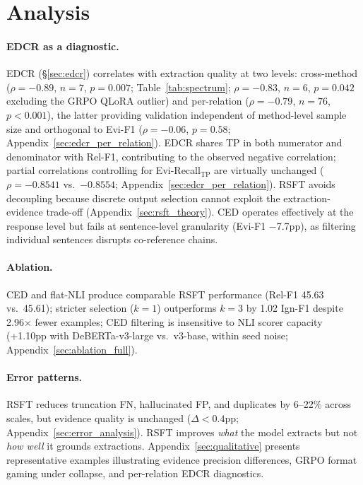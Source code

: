 \section{Analysis}
\label{sec:analysis}

\paragraph{EDCR as a diagnostic.}
EDCR (\S\ref{sec:edcr}) correlates with extraction quality at two levels: cross-method ($\rho = -0.89$, $n = 7$, $p = 0.007$; Table~\ref{tab:spectrum}; $\rho = -0.83$, $n = 6$, $p = 0.042$ excluding the GRPO QLoRA outlier) and per-relation ($\rho = -0.79$, $n = 76$, $p < 0.001$), the latter providing validation independent of method-level sample size and orthogonal to Evi-F1 ($\rho = -0.06$, $p = 0.58$; Appendix~\ref{sec:edcr_per_relation}). EDCR shares TP in both numerator and denominator with Rel-F1, contributing to the observed negative correlation; partial correlations controlling for Evi-Recall$_\text{TP}$ are virtually unchanged ($\rho = -0.8541$ vs.\ $-0.8554$; Appendix~\ref{sec:edcr_per_relation}). RSFT avoids decoupling because discrete output selection cannot exploit the extraction-evidence trade-off (Appendix~\ref{sec:rsft_theory}). CED operates effectively at the response level but fails at sentence-level granularity (Evi-F1 $-$7.7pp), as filtering individual sentences disrupts co-reference chains.

\paragraph{Ablation.}
CED and flat-NLI produce comparable RSFT performance (Rel-F1 45.63 vs.\ 45.61); stricter selection ($k{=}1$) outperforms $k{=}3$ by 1.02 Ign-F1 despite 2.96$\times$ fewer examples; CED filtering is insensitive to NLI scorer capacity (+1.10pp with DeBERTa-v3-large vs.\ v3-base, within seed noise; Appendix~\ref{sec:ablation_full}).

\paragraph{Error patterns.}
RSFT reduces truncation FN, hallucinated FP, and duplicates by 6--22\% across scales, but evidence quality is unchanged ($\Delta < 0.4$pp; Appendix~\ref{sec:error_analysis}). RSFT improves \emph{what} the model extracts but not \emph{how well} it grounds extractions. Appendix~\ref{sec:qualitative} presents representative examples illustrating evidence precision differences, GRPO format gaming under collapse, and per-relation EDCR diagnostics.

